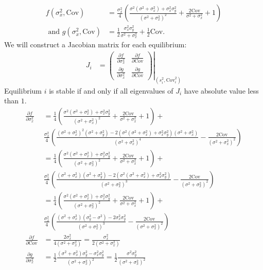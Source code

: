 \documentclass{article}
\newcommand{\Cov}{\text{Cov}}
\begin{document}
\begin{enumerate}
\begin{align*}
f(\sigma_x^2,\Cov)&=\frac{\sigma_x^2}{4}\left(\frac{\sigma^2(\sigma^2+\sigma_x^2)+\sigma_x^2\sigma_y^2}{(\sigma^2+\sigma_x^2)^2}+\frac{2\Cov}{\sigma^2+\sigma_x^2}+1\right)
\\ \text{ and } g(\sigma_x^2,\Cov)&=\frac{1}{2}\frac{\sigma_x^2\sigma_y^2}{\sigma^2+\sigma_x^2}+\frac{1}{2}\Cov.
\end{align*}
We will construct a Jacobian matrix for each equilibrium:
\begin{align*}
J_i&=\left.\left(\begin{array}{cc} \frac{\partial f}{\partial \sigma_x^2} & \frac{\partial f }{\partial \Cov} \\ \frac{\partial g}{\partial \sigma_x^2} & \frac{\partial g}{\partial \Cov}\end{array}\right)\right|_{(s_i^2,\Cov_i^2)}
\end{align*}
Equilibrium $i$ is stable if and only if all eigenvalues of $J_i$ have absolute value less than $1$. 
\begin{align*}
\frac{\partial f}{\partial \sigma_x^2}&=\frac{1}{4}\left(\frac{\sigma^2(\sigma^2+\sigma_x^2)+\sigma_x^2\sigma_y^2}{(\sigma^2+\sigma_x^2)^2}+\frac{2\Cov}{\sigma^2+\sigma_x^2}+1\right)+
\\&\frac{\sigma_x^2}{4}\left(\frac{(\sigma^2+\sigma_x^2)^2(\sigma^2+\sigma_y^2)-2(\sigma^2(\sigma^2+\sigma_x^2)+\sigma_x^2\sigma_y^2)(\sigma^2+\sigma_x^2)}{(\sigma^2+\sigma_x^2)^4}-\frac{2\Cov}{(\sigma^2+\sigma_x^2)^2}\right)
\\&=\frac{1}{4}\left(\frac{\sigma^2(\sigma^2+\sigma_x^2)+\sigma_x^2\sigma_y^2}{(\sigma^2+\sigma_x^2)^2}+\frac{2\Cov}{\sigma^2+\sigma_x^2}+1\right)+
\\&\frac{\sigma_x^2}{4}\left(\frac{(\sigma^2+\sigma_x^2)(\sigma^2+\sigma_y^2)-2(\sigma^2(\sigma^2+\sigma_x^2)+\sigma_x^2\sigma_y^2)}{(\sigma^2+\sigma_x^2)^3}-\frac{2\Cov}{(\sigma^2+\sigma_x^2)^2}\right)
\\&=\frac{1}{4}\left(\frac{\sigma^2(\sigma^2+\sigma_x^2)+\sigma_x^2\sigma_y^2}{(\sigma^2+\sigma_x^2)^2}+\frac{2\Cov}{\sigma^2+\sigma_x^2}+1\right)+
\\&\frac{\sigma_x^2}{4}\left(\frac{(\sigma^2+\sigma_x^2)(\sigma_y^2-\sigma^2)-2\sigma_x^2\sigma_y^2}{(\sigma^2+\sigma_x^2)^3}-\frac{2\Cov}{(\sigma^2+\sigma_x^2)^2}\right)
\\ \frac{\partial f}{\partial \Cov}&=\frac{2\sigma_x^2}{4(\sigma^2+\sigma_x^2)}=\frac{\sigma_x^2}{2(\sigma^2+\sigma_x^2)}
\\ \frac{\partial g}{\partial \sigma_x^2}&=\frac{1}{2}\frac{(\sigma^2+\sigma_x^2)\sigma_y^2-\sigma_x^2\sigma_y^2}{(\sigma^2+\sigma_x^2)^2}=\frac{1}{2}\frac{\sigma^2\sigma_y^2}{(\sigma^2+\sigma_x^2)^2}

\end{align*}
\end{enumerate}
\end{document}
